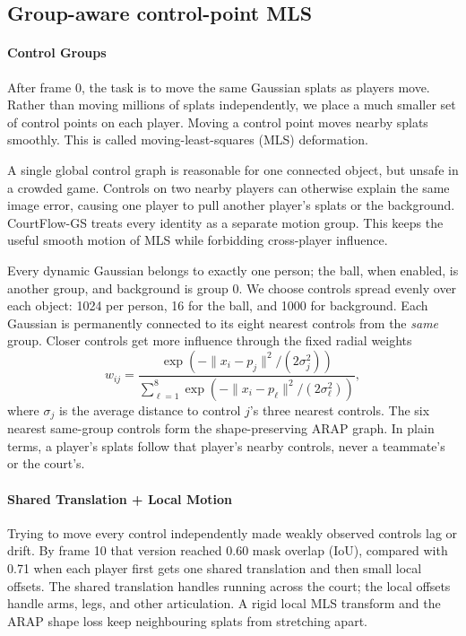 \documentclass[11pt]{article}
\begin{document}
\subsection{Group-aware control-point MLS}
\paragraph{Control Groups}
After frame 0, the task is to move the same Gaussian splats as players move. Rather than moving
millions of splats independently, we place a much smaller set of control points on each player.
Moving a control point moves nearby splats smoothly. This is called moving-least-squares (MLS)
deformation.

A single global control graph is reasonable for one connected object, but unsafe in a crowded game.
Controls on two nearby players can otherwise explain the same image error, causing one player to
pull another player's splats or the background. CourtFlow-GS treats every identity as a separate
motion group. This keeps the useful smooth motion of MLS while forbidding cross-player influence.

Every dynamic Gaussian belongs to exactly one person; the ball, when enabled, is another group,
and background is group 0. We choose controls spread evenly over each object: 1024 per person,
16 for the ball, and 1000 for background. Each Gaussian is permanently connected to its eight
nearest controls from the \emph{same} group. Closer controls get more influence through the fixed
radial weights
\[
w_{ij}=\frac{\exp(-\|x_i-p_j\|^2/(2\sigma_j^2))}
{\sum_{\ell=1}^{8}\exp(-\|x_i-p_\ell\|^2/(2\sigma_\ell^2))},
\]
where $\sigma_j$ is the average distance to control $j$'s three nearest controls. The six nearest
same-group controls form the shape-preserving ARAP graph. In plain terms, a player's splats follow
that player's nearby controls, never a teammate's or the court's.

\paragraph{Shared Translation + Local Motion}
Trying to move every control independently made weakly observed controls lag or drift. By frame 10
that version reached 0.60 mask overlap (IoU), compared with 0.71 when each player first gets one
shared translation and then small local offsets. The shared translation handles running across the
court; the local offsets handle arms, legs, and other articulation. A rigid local MLS transform
and the ARAP shape loss keep neighbouring splats from stretching apart.
\end{document}
